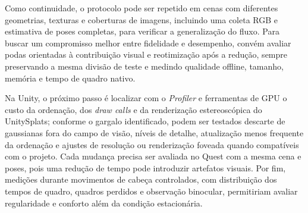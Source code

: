 Como continuidade, o protocolo pode ser repetido em cenas com diferentes geometrias, texturas e coberturas de imagens, incluindo uma coleta RGB e estimativa de poses completas, para verificar a generalização do fluxo. Para buscar um compromisso melhor entre fidelidade e desempenho, convém avaliar podas orientadas à contribuição visual e reotimização após a redução, sempre preservando a mesma divisão de teste e medindo qualidade offline, tamanho, memória e tempo de quadro nativo. 

Na Unity, o próximo passo é localizar com o \textit{Profiler} e ferramentas de GPU o custo da ordenação, dos \textit{draw calls} e da renderização estereoscópica do UnitySplats; conforme o gargalo identificado, podem ser testados descarte de gaussianas fora do campo de visão, níveis de detalhe, atualização menos frequente da ordenação e ajustes de resolução ou renderização foveada quando compatíveis com o projeto. Cada mudança precisa ser avaliada no Quest com a mesma cena e poses, pois uma redução de tempo pode introduzir artefatos visuais. Por fim, medições durante movimentos de cabeça controlados, com distribuição dos tempos de quadro, quadros perdidos e observação binocular, permitiriam avaliar regularidade e conforto além da condição estacionária.
